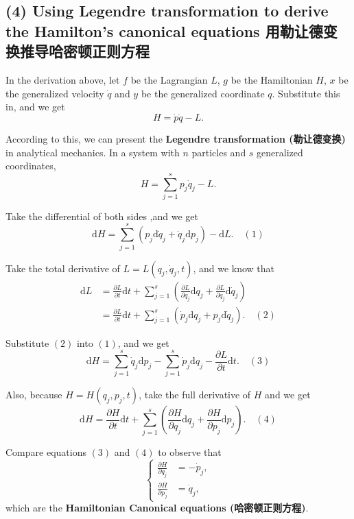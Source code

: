 \subsection*{(4) Using Legendre transformation to derive the
Hamilton's canonical equations
用勒让德变换推导哈密顿正则方程}\label{using-legendre-transformation-to-derive-the-hamiltons-canonical-equations-ux7528ux52d2ux8ba9ux5fb7ux53d8ux6362ux63a8ux5bfcux54c8ux5bc6ux987fux6b63ux5219ux65b9ux7a0b}

In the derivation above, let \(f\) be the Lagrangian \(L\), \(g\) be the
Hamiltonian \(H\), \(x\) be the generalized velocity \(\dot{q}\) and
\(y\) be the generalized coordinate \(q\). Substitute this in, and we
get \[H = \dot{p} \dot{q} - L.\]

According to this, we can present the \textbf{Legendre transformation
(勒让德变换)} in analytical mechanics. In a system with \(n\) particles
and \(s\) generalized coordinates,
\[H = \sum_{j = 1}^{s} p_j \dot{q}_j - L.\]

Take the differential of both sides ,and we get
\[\mathrm{d}H = \sum_{j = 1}^{s} \left( p_j \mathrm{d} \dot{q}_j + \dot{q}_j \mathrm{d} p_j \right) - \mathrm{d}L. \quad(1)\]

Take the total derivative of \(L = L(q_j, \dot{q}_j, t)\), and we know
that \begin{align*}
    \mathrm{d}L & = \frac{\partial L}{\partial t} \mathrm{d}t + \sum_{j = 1}^{s} \left( \frac{\partial L}{\partial q_j} \mathrm{d}q_j + \frac{\partial L}{\partial \dot{q}_j} \mathrm{d} \dot{q}_j \right) \\
    & = \frac{\partial L}{\partial t} \mathrm{d}t + \sum_{j = 1}^{s} \left( \dot{p}_j \mathrm{d}q_j + {p}_j \mathrm{d} \dot{q}_j \right). \quad(2)
\end{align*}

Substitute \((2)\) into \((1)\), and we get
\[\mathrm{d}H = \sum_{j = 1}^{s} \dot{q}_j \mathrm{d} p_j - \sum_{j = 1}^{s} \dot{p}_j \mathrm{d}q_j - \frac{\partial L}{\partial t} \mathrm{d}t. \quad(3)\]

Also, because \(H = H(q_j, p_j, t)\), take the full derivative of \(H\)
and we get
\[\mathrm{d}H = \frac{\partial H}{\partial t} \mathrm{d}t + \sum_{j = 1}^{s} \left( \frac{\partial H}{\partial q_j} \mathrm{d}q_j + \frac{\partial H}{\partial p_j} \mathrm{d} p_j \right). \quad(4)\]

Compare equations \((3)\) and \((4)\) to observe that \[\left\{
    \begin{aligned}
        \frac{\partial H}{\partial q_j} &= -\dot{p}_j, \\
        \frac{\partial H}{\partial p_j} &= \dot{q}_j,
    \end{aligned}
\right.\] which are the \textbf{Hamiltonian Canonical equations
(哈密顿正则方程)}.

